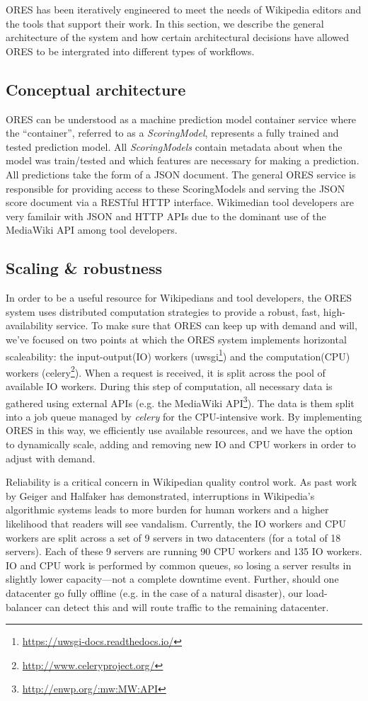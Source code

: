 ORES has been iteratively engineered to meet the needs of Wikipedia editors and the tools that support their work.  In this section, we describe the general architecture of the system and how certain architectural decisions have allowed ORES to be intergrated into different types of workflows.  

\subsection{Conceptual architecture}
ORES can be understood as a machine prediction model container service where the ``container'', referred to as a \emph{ScoringModel}, represents a fully trained and tested prediction model.  All \emph{ScoringModels} contain metadata about when the model was train/tested and which features are necessary for making a prediction.  All predictions take the form of a JSON document.  The general ORES service is responsible for providing access to these ScoringModels and serving the JSON score document via a RESTful HTTP interface.  Wikimedian tool developers are very familair with JSON and HTTP APIs due to the dominant use of the MediaWiki API among tool developers.

\subsection{Scaling \& robustness}
In order to be a useful resource for Wikipedians and tool developers, the ORES system uses distributed computation strategies to provide a robust, fast, high-availability service.  To make sure that ORES can keep up with demand and will, we've focused on two points at which the ORES system implements horizontal scaleability: the input-output(IO) workers (uwsgi\footnote{\url{https://uwsgi-docs.readthedocs.io/}}) and the computation(CPU) workers (celery\footnote{\url{http://www.celeryproject.org/}}).  When a request is received, it is split across the pool of available IO workers.  During this step of computation, all necessary data is gathered using external APIs (e.g. the MediaWiki API\footnote{\url{http://enwp.org/:mw:MW:API}}).  The data is them split into a job queue managed by \emph{celery} for the CPU-intensive work.  By implementing ORES in this way, we efficiently use available resources, and we have the option to dynamically scale, adding and removing new IO and CPU workers in order to adjust with demand.

Reliability is a critical concern in Wikipedian quality control work.  As past work by Geiger and Halfaker has demonstrated, interruptions in Wikipedia's algorithmic systems leads to more burden for human workers and a higher likelihood that readers will see vandalism\cite{geiger13levee}. Currently, the IO workers and CPU workers are split across a set of 9 servers in two datacenters (for a total of 18 servers).  Each of these 9 servers are running 90 CPU workers and 135 IO workers.  IO and CPU work is performed by common queues, so losing a server results in slightly lower capacity---not a complete downtime event.  Further, should one datacenter go fully offline (e.g. in the case of a natural disaster), our load-balancer can detect this and will route traffic to the remaining datacenter.

